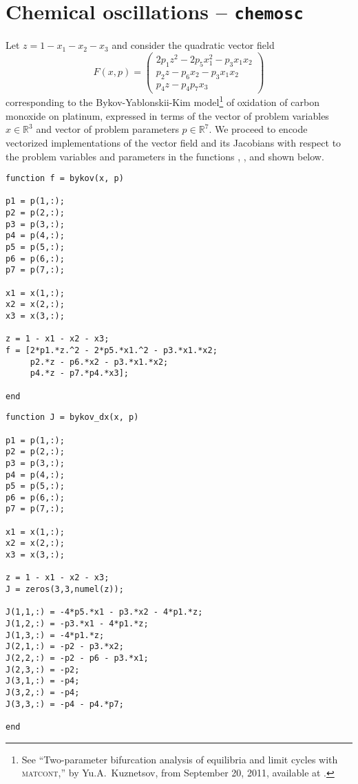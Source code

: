 \section{Chemical oscillations -- \texttt{chemosc}}
Let $z = 1 - x_1 - x_2 - x_3$ and consider the quadratic vector field
\begin{equation}
F(x,p) = \left(\begin{array}{c}2p_1z^2-2p_5x_1^2-p_3x_1x_2\\p_2z-p_6x_2-p_3x_1x_2\\p_4z-p_4p_7x_3\end{array}\right)
\end{equation}
corresponding to the Bykov-Yablonskii-Kim model\footnote{See ``Two-parameter bifurcation analysis of equilibria and limit cycles with \textsc{matcont},'' by Yu.A.~Kuznetsov, from September 20, 2011, available at .} of oxidation of carbon monoxide on platinum, expressed in terms of the vector of problem variables $x\in\mathbb{R}^3$ and vector of problem parameters $p\in\mathbb{R}^7$. We proceed to encode vectorized implementations of the vector field and its Jacobians with respect to the problem variables and parameters in the functions , , and  shown below.
\begin{lstlisting}[language=coco-highlight]
function f = bykov(x, p)

p1 = p(1,:);
p2 = p(2,:);
p3 = p(3,:);
p4 = p(4,:);
p5 = p(5,:);
p6 = p(6,:);
p7 = p(7,:);

x1 = x(1,:);
x2 = x(2,:);
x3 = x(3,:);

z = 1 - x1 - x2 - x3;
f = [2*p1.*z.^2 - 2*p5.*x1.^2 - p3.*x1.*x2;
     p2.*z - p6.*x2 - p3.*x1.*x2;
     p4.*z - p7.*p4.*x3];

end
\end{lstlisting}
\begin{lstlisting}[language=coco-highlight]
function J = bykov_dx(x, p)

p1 = p(1,:);
p2 = p(2,:);
p3 = p(3,:);
p4 = p(4,:);
p5 = p(5,:);
p6 = p(6,:);
p7 = p(7,:);

x1 = x(1,:);
x2 = x(2,:);
x3 = x(3,:);

z = 1 - x1 - x2 - x3;
J = zeros(3,3,numel(z));

J(1,1,:) = -4*p5.*x1 - p3.*x2 - 4*p1.*z;
J(1,2,:) = -p3.*x1 - 4*p1.*z;
J(1,3,:) = -4*p1.*z;
J(2,1,:) = -p2 - p3.*x2;
J(2,2,:) = -p2 - p6 - p3.*x1;
J(2,3,:) = -p2;
J(3,1,:) = -p4;
J(3,2,:) = -p4;
J(3,3,:) = -p4 - p4.*p7;

end
\end{lstlisting}

